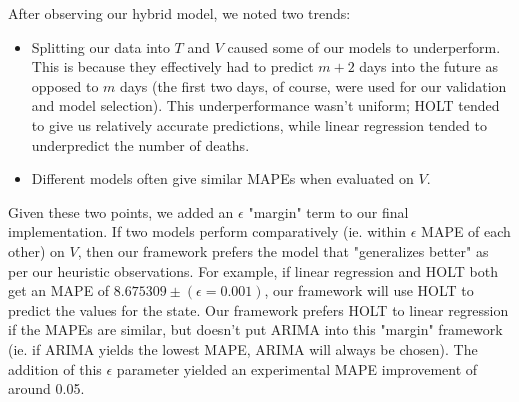 \documentclass[sigconf,nonacm]{acmart}
\begin{document}
After observing our hybrid model, we noted two trends: 
\begin{itemize}
\item 
Splitting our data into $T$ and $V$ caused some of our models to
underperform. This is because they effectively had to predict $m+2$ days into
the future as opposed to $m$ days (the first two days, of course, were used for
our validation and model selection). This underperformance wasn't uniform;
HOLT tended to give us relatively accurate predictions, while linear regression
tended to underpredict the number of deaths. 
\item
Different models often give similar MAPEs when evaluated on $V$. 
\end{itemize}

Given these two points, we added an $\epsilon$ "margin" term to our final
implementation. If two models perform comparatively (ie. within $\epsilon$ MAPE
of each other) on $V$, then our framework prefers the model that "generalizes
better" as per our heuristic observations. For example, if linear regression
and HOLT both get an MAPE of $8.675309 \pm (\epsilon = 0.001)$, our framework
will use HOLT to predict the values for the state. Our framework prefers HOLT
to linear regression if the MAPEs are similar, but doesn't put ARIMA into this
"margin" framework (ie. if ARIMA yields the lowest MAPE, ARIMA will always be
chosen). The addition of this $\epsilon$ parameter yielded an experimental 
MAPE improvement of around 0.05. 



\end{document}
